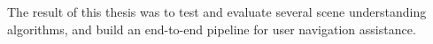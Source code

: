 The result of this thesis was to test and evaluate
several scene understanding algorithms, and build
an end-to-end pipeline for user navigation assistance.